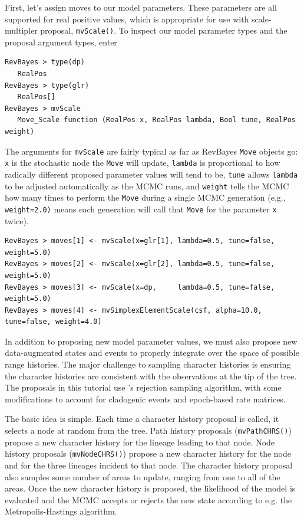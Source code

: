 \documentclass[11pt]{article}
\begin{document}
First, let's assign moves to our model parameters.
These parameters are all supported for real positive values, which is appropriate for use with scale-multipler proposal, {\tt mvScale()}.
To inspect our model parameter types and the proposal argument types, enter

\begin{snugshade}
\begin{lstlisting}
RevBayes > type(dp)
   RealPos
RevBayes > type(glr)
   RealPos[]
RevBayes > mvScale
   Move_Scale function (RealPos x, RealPos lambda, Bool tune, RealPos weight)
\end{lstlisting}
\end{snugshade}

The arguments for {\tt mvScale} are fairly typical as far as RevBayes {\tt Move} objects go: {\tt x} is the stochastic node the {\tt Move} will update, {\tt lambda} is proportional to how radically different proposed parameter values will tend to be, {\tt tune} allows {\tt lambda} to be adjusted automatically as the MCMC runs, and {\tt weight} tells the MCMC how many times to perform the {\tt Move} during a single MCMC generation (e.g., {\tt weight=2.0)} means each generation will call that {\tt Move} for the parameter {\tt x} twice).


\begin{snugshade}
\begin{lstlisting}
RevBayes > moves[1] <- mvScale(x=glr[1], lambda=0.5, tune=false, weight=5.0)
RevBayes > moves[2] <- mvScale(x=glr[2], lambda=0.5, tune=false, weight=5.0)
RevBayes > moves[3] <- mvScale(x=dp, 	 lambda=0.5, tune=false, weight=5.0)
RevBayes > moves[4] <- mvSimplexElementScale(csf, alpha=10.0, tune=false, weight=4.0)
\end{lstlisting}
\end{snugshade}

In addition to proposing new model parameter values, we must also propose new data-augmented states and events to properly integrate over the space of possible range histories.
The major challenge to sampling character histories is ensuring the character histories are consistent with the observations at the tip of the tree.
The proposals in this tutorial use \citet{nielsen02}'s rejection sampling algorithm, with some modifications to account for cladogenic events and epoch-based rate matrices.

The basic idea is simple.
Each time a character history proposal is called, it selects a node at random from the tree.
Path history proposals ({\tt mvPathCHRS()}) propose a new character history for the lineage leading to that node.
Node history proposals ({\tt mvNodeCHRS()}) propose a new character history for the node and for the three lineages incident to that node.
The character history proposal also samples some number of areas to update, ranging from one to all of the areas.
Once the new character history is proposed, the likelihood of the model is evaluated and the MCMC accepts or rejects the new state according to e.g. the Metropolis-Hastings algorithm.
\end{document}
